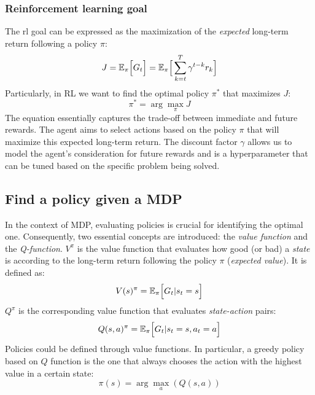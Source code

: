 \subsubsection*{Reinforcement learning goal}
The \ac{rl} goal can be expressed as the maximization of the \emph{expected} 
 long-term return following a policy $\pi$:
\begin{equation}
J = \mathbb{E_\pi}\Big[ G_t \Big] = \mathbb{E}_\pi \Big[ \sum_{k = t}^T \gamma^{t-k} r_k \Big] 
\end{equation}
Particularly, in \ac{RL} we want to find the optimal policy $\pi^*$ that maximizes $J$:
\begin{equation}
\pi^* = \arg \max_{\pi} J
\end{equation}
The equation essentially captures the trade-off between immediate and future rewards. 
 The agent aims to select actions based on the policy \(\pi\) 
 that will maximize this expected long-term return. 
 The discount factor \(\gamma\) allows us to model the agent's consideration 
 for future rewards and is a hyperparameter that can be tuned based on the specific problem being solved.

\subsection{Find a policy given a MDP}
In the context of MDP, evaluating policies is crucial for identifying the optimal one. 
 Consequently, two essential concepts are introduced: the \emph{value function} and the \emph{Q-function}.
$V^\pi$ is the value function that evaluates how good (or bad) a \emph{state} 
 is according to the long-term return following the policy $\pi$ (\emph{expected value}).
% 
It is defined as:
\begin{equation}
V(s)^\pi = \mathbb{E}_\pi \Big[ G_t | s_t = s \Big]
\end{equation}
$Q^\pi$ is the corresponding value function that evaluates \emph{state-action} pairs:
\begin{equation}
Q(s, a)^\pi = \mathbb{E}_\pi \Big[ G_t | s_t = s, a_t = a \Big]
\end{equation}
Policies could be defined through value functions. 
 In particular, a greedy policy based on $Q$ function is the one that always chooses 
 the action with the highest value in a certain state:
\begin{equation}
\pi(s) = \arg \max_{a}(Q(s, a))
\end{equation}
